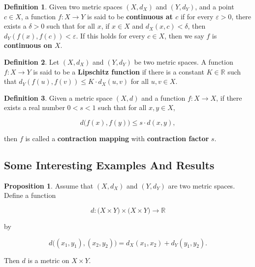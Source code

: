 \documentclass{article}
\theoremstyle{definition}
\newtheorem{prop}{Proposition}[section]
\newtheorem{definition}{Definition}[section]
\theoremstyle{remark}
\theoremstyle{definition}
\begin{document}
\begin{definition}
\label{df:1.5}
    Given two metric spaces $(X,d_X)$ and $(Y,d_Y)$, and a point $c\in X$, a function $f\colon X\rightarrow Y$ is said to be \textbf{continuous at $c$} if for every $\varepsilon>0$, there exists a $\delta>0$ such that for all $x$, if $x\in X$ and $d_X(x,c)<\delta$, then $d_Y(f(x),f(c))<\varepsilon$. If this holds for every $c\in X$, then we say $f$ is \textbf{continuous on $X$}.
\end{definition}

\begin{definition}
\label{df:1.6}
    Let $(X, d_X)$ and $(Y,d_Y)$ be two metric spaces. A function $f\colon X\rightarrow Y$ is said to be a \textbf{Lipschitz function} if there is a constant $K\in\mathbb{R}$ such that $d_Y(f(u),f(v))\leq K\cdot d_X(u,v)$ for all $u, v\in X$.
\end{definition}

\begin{definition}
\label{df:1.7}
    Given a metric space $(X,d)$ and a function $f\colon X\rightarrow X$, if there exists a real number $0<s<1$ such that for all $x,y\in X$,
    
    \begin{equation*}
        d\big(f(x),f(y)\big)\leq s\cdot d(x,y),
    \end{equation*}
    
    \noindent then $f$ is called a \textbf{contraction mapping} with \textbf{contraction factor} $s$.
\end{definition}

\newpage

\subsection{Some Interesting Examples And Results}

\vspace{0.5mm}

\hline 

\vspace{4mm}

    
    \begin{prop}\label{prop:1.2} 
        Assume that $(X,d_X)$ and $(Y,d_Y)$ are two metric spaces. Define a function 
    
        \begin{equation*}
            d\colon\big(X\times Y\big)\times\big(X\times Y\big)\rightarrow\mathbb{R}
        \end{equation*}
    
        \noindent by 
    
        \begin{equation*}
            d\big((x_1,y_1),(x_2,y_2)\big)=d_X(x_1,x_2)+d_Y(y_1,y_2).
        \end{equation*}
    
        \noindent Then $d$ is a metric on $X\times Y$.
    \end{prop}
    
\end{document}
